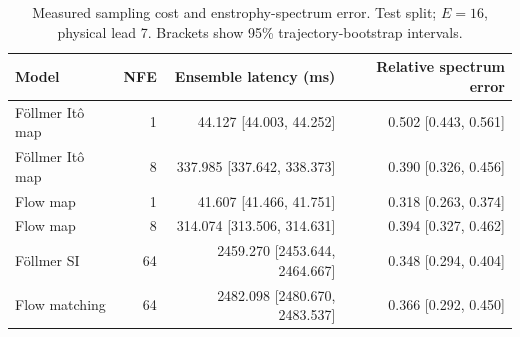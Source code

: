 \begin{table}[t]
\centering
\small
\setlength{\tabcolsep}{3pt}
\caption{Measured sampling cost and enstrophy-spectrum error. Test split; $E=16$, physical lead 7. Brackets show 95\% trajectory-bootstrap intervals.}
\label{tab:map-cost}
\begin{tabular}{lrrr}
\toprule
Model & NFE & Ensemble latency (ms) & Relative spectrum error \\
\midrule
Föllmer Itô map & 1 & 44.127 [44.003, 44.252] & 0.502 [0.443, 0.561] \\
Föllmer Itô map & 8 & 337.985 [337.642, 338.373] & 0.390 [0.326, 0.456] \\
\addlinespace
Flow map & 1 & 41.607 [41.466, 41.751] & 0.318 [0.263, 0.374] \\
Flow map & 8 & 314.074 [313.506, 314.631] & 0.394 [0.327, 0.462] \\
\addlinespace
Föllmer SI & 64 & 2459.270 [2453.644, 2464.667] & 0.348 [0.294, 0.404] \\
\addlinespace
Flow matching & 64 & 2482.098 [2480.670, 2483.537] & 0.366 [0.292, 0.450] \\
\bottomrule
\end{tabular}
\end{table}
